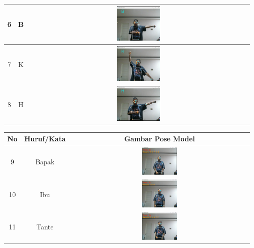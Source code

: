 \begin{table}[!hbt]
\begin{tabular}{|c|c|c|}
	\hline
	6 & B & \includegraphics[width=0.2\textwidth]{gambar/bener/HurufB_ModelCNN2_Fachry.png} \\
	\hline
	7 & K & \includegraphics[width=0.2\textwidth]{gambar/bener/HurufK_ModelCNN2_Fachry.png} \\
	\hline
	8 & H & \includegraphics[width=0.2\textwidth]{gambar/bener/HurufH_ModelCNN2_Fachry.png} \\
	\hline
	\end{tabular}
\end{table}

\begin{table}[!hbt]
	\centering
	\begin{tabular}{|c|c|c|}
		\hline
		No & Huruf/Kata & Gambar Pose Model  \\
		\hline
		9 & Bapak & \includegraphics[width=0.2\textwidth]{gambar/bener/HurufBapak_ModelCNN2_Fachry.png} \\
		\hline
		10 & Ibu & \includegraphics[width=0.2\textwidth]{gambar/bener/HurufIbu_ModelCNN2_Fachry.png} \\
		\hline
		11 & Tante & \includegraphics[width=0.2\textwidth]{gambar/bener/HurufTante_ModelCNN2_Fachry.png} \\
		\hline
	\end{tabular}
\end{table}

